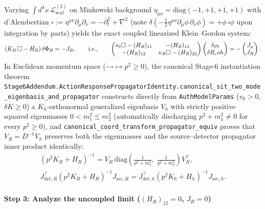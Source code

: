 Varying $\int d^4x\,\mathcal{L}^{(2)}_{\mathrm{scal}}$ on Minkowski background $\eta_{\mu\nu} = \mathrm{diag}(-1,+1,+1,+1)$ with d'Alembertian $\square := \eta^{\mu\nu}\partial_\mu\partial_\nu = -\partial_t^2 + \nabla^2$ (note $\delta(-\frac{1}{2}\eta^{\mu\nu}\partial_\mu\phi\,\partial_\nu\phi) = +\phi\,\square\phi$ upon integration by parts) yields the exact coupled linearized Klein--Gordon system:
\[
(K_R\,\square - H_R)\,\delta\Phi_R = -J_R,
\qquad\text{i.e.,}\qquad
\begin{pmatrix} \kappa_t\square - (H_R)_{11} & -(H_R)_{12} \\ -(H_R)_{12} & \kappa_R\square - (H_R)_{22} \end{pmatrix}
\begin{pmatrix} \delta\rho_t \\ \delta R_coh \end{pmatrix}
= -\begin{pmatrix} J_\rho \\ J_R \end{pmatrix}.
\]
In Euclidean momentum space ($-\square \mapsto p^2 \ge 0$), the canonical Stage-6 instantiation theorem \texttt{Stage6Addendum.\allowbreak{}ActionResponsePropagatorIdentity.\allowbreak{}canonical\_\allowbreak{}sit\_\allowbreak{}two\_\allowbreak{}mode\_\allowbreak{}eigenbasis\_\allowbreak{}and\_\allowbreak{}propagator} constructs directly from \texttt{AuthModelParams} ($v_0 > 0$, $\delta K \ge 0$) a $K_h$-orthonormal generalized eigenbasis $V_h$ with strictly positive squared eigenmasses $0 < m_1^2 \le m_2^2$ (automatically discharging $p^2 + m_a^2 \ne 0$ for every $p^2 \ge 0$), and \texttt{canonical\_\allowbreak{}coord\_\allowbreak{}transform\_\allowbreak{}propagator\_\allowbreak{}equiv} proves that $V_R = D^{-1} V_h$ preserves both the eigenmasses and the source--detector propagator inner product identically:
\begin{gather*}
(p^2 K_R + H_R)^{-1} = V_R\,\mathrm{diag}\!\left(\frac{1}{p^2 + m_1^2},\; \frac{1}{p^2 + m_2^2}\right) V_R^\top,\\[0.3em]
J_{\mathrm{det},R}^\top (p^2 K_R + H_R)^{-1} J_{\mathrm{src},R} = J_{\mathrm{det},h}^\top (p^2 K_h + H_h)^{-1} J_{\mathrm{src},h}.
\end{gather*}

\paragraph{Step 3: Analyze the uncoupled limit ($(H_R)_{12} = 0$, $J_R = 0$)}

